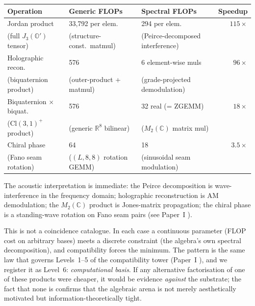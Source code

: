 \documentclass[11pt,a4paper]{article}
\theoremstyle{plain}
\theoremstyle{definition}
\theoremstyle{remark}
\numberwithin{equation}{section}
\providecommand{\Cl}{\mathrm{Cl}}
\providecommand{\R}{\mathbb{R}}
\providecommand{\C}{\mathbb{C}}
\providecommand{\Os}{\mathbb{O}'}
\begin{document}
\begin{center}
\renewcommand{\arraystretch}{1.25}
\begin{tabular}{l l l r}
\toprule
\textbf{Operation}  & \textbf{Generic FLOPs} & \textbf{Spectral FLOPs} & \textbf{Speedup} \\
\midrule
Jordan product       & 33{,}792 per elem.     & 294 per elem.           & $115\times$  \\
  \quad \footnotesize (full $J_3(\Os)$ tensor)
                     & \footnotesize (structure-const.\ matmul)
                     & \footnotesize (Peirce-decomposed interference)
                     & \\
Holographic recon.   & 576                    & 6 element-wise muls     & $96\times$   \\
  \quad \footnotesize (biquaternion product)
                     & \footnotesize (outer-product + matmul)
                     & \footnotesize (grade-projected demodulation)
                     & \\
Biquaternion $\times$ biquat. & 576           & 32 real (= ZGEMM)       & $18\times$   \\
  \quad \footnotesize ($\Cl(3,1)^+$ product)
                     & \footnotesize (generic $\R^8$ bilinear)
                     & \footnotesize ($M_2(\C)$ matrix mul)
                     & \\
Chiral phase         & 64                     & 18                      & $3.5\times$  \\
  \quad \footnotesize (Fano seam rotation)
                     & \footnotesize ($(L,8,8)$ rotation GEMM)
                     & \footnotesize (sinusoidal seam modulation)
                     & \\
\bottomrule
\end{tabular}
\end{center}

The acoustic interpretation is immediate: the Peirce decomposition
is wave-interference in the frequency domain; holographic
reconstruction is AM demodulation; the $M_2(\C)$ product is
Jones-matrix propagation; the chiral phase is a standing-wave
rotation on Fano seam pairs (see Paper~I
\cite[Rmks.~4.6, 3.7]{paper-I-substrate}).

This is not a coincidence catalogue.  In each case a continuous
parameter (FLOP cost on arbitrary bases) meets a discrete
constraint (the algebra's own spectral decomposition), and
compatibility forces the minimum.  The pattern is the same law that
governs Levels~1--5 of the compatibility tower
(Paper~I \cite[\S 6]{paper-I-substrate}), and we register it as
Level~6: \emph{computational basis}.  If any alternative
factorisation of one of these products were cheaper, it would be
evidence \emph{against} the substrate; the fact that none is
confirms that the algebraic arena is not merely aesthetically
motivated but information-theoretically tight.
\end{document}
